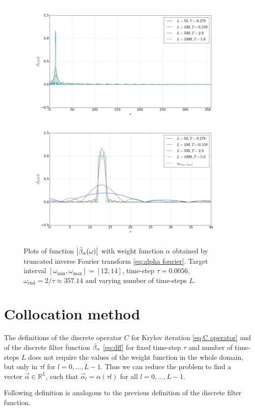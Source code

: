 \documentclass[a4paper,11pt,bibliography=totoc,listof=totoc,headinclude=true,cleardoublepage=empty,oneside]{scrbook}
\newcommand{\R}{\mathbb{R}}
\newcommand{\dff}{\Tilde{\beta}_\alpha}
\newcommand{\e}{\mathrm{end}}
\begin{document}
\begin{figure}[h]
    \centering
    \includegraphics[width=0.75\linewidth]{latex//images//fourier/Figure_4.png}
    \includegraphics[width=0.75\linewidth]{latex//images//fourier/Figure_5.png}
    \caption{Plots of function $\left|\dff(\omega) \right|$ with weight function $\alpha$ obtained by truncated inverse Fourier transform \eqref{eq:alpha fourier}. Target interval $\left[\omega_{\min}, \omega_{\max} \right] = [12, 14]$, time-step $\tau = 0.0056$, $\omega_\e = 2/\tau \approx 357.14$ and varying number of time-steps $L$. }
    \label{fig:fourier2}
\end{figure}

\section{Collocation method}\label{section:collocation}
The definitions of the discrete operator $C$ for Krylov iteration \eqref{eq:C operator} and of the discrete filter function $\dff$ \eqref{eq:dff} for fixed time-step $\tau$ and number of time-steps $L$ does not require the values of the weight function in the whole domain, but only in $\tau l$ for $l=0, \dots, L-1$. Thus we can reduce the problem to find a vector $\Vec{\alpha} \in \R^L$, such that $\Vec{\alpha}_l = \alpha(\tau l)$ for all $l=0, \dots, L-1$.

Following definition is analogous to the previous definition of the discrete filter function.
\end{document}
